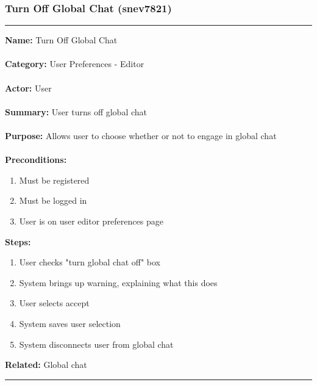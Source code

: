 \documentclass[11pt]{report}
\begin{document}
\subsubsection{Turn Off Global Chat (snev7821)}
\vspace{2pt}
\hrule
\vspace{8pt}
	\noindent\textbf{Name:} Turn Off Global Chat \\ \\
	\textbf{Category:} User Preferences - Editor  \\ \\
	\textbf{Actor:} User \\ \\
	\textbf{Summary:} User turns off global chat \\ \\
	\textbf{Purpose:} Allows user to choose whether or not to engage in global chat \\ \\
	\textbf{Preconditions:} 
	\begin{enumerate}
		\item Must be registered
		\item Must be logged in
		\item User is on user editor preferences page
	\end{enumerate}
	\textbf{Steps:}
	\begin{enumerate}
		\item User checks "turn global chat off" box
		\item System brings up warning, explaining what this does
		\item User selects accept
		\item System saves user selection
		\item System disconnects user from global chat
	\end{enumerate}
	\textbf{Related:} Global chat
\vspace{8pt}
\hrule

\newpage
\end{document}
